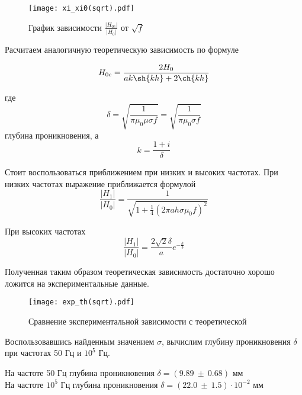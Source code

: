     \begin{figure}
        \centering
        \texttt{[image: xi\_xi0(sqrt).pdf]}
        \caption{График зависимости $\frac{|H_{0c}|}{|H_{0}|}$ от $\sqrt{f}$}
        \label{xi_xi0(sqrt)}
    \end{figure}

    Расчитаем аналогичную теоретическую зависимость по формуле

    \begin{equation}
        H_{0c} = \frac{2 H_0}{a k \sh{k h} + 2 \ch{k h}}
    \end{equation}

    где
    \begin{equation}
        \delta = \sqrt{\frac{1}{\pi \mu_0 \mu \sigma f}} = \sqrt{\frac{1}{\pi \mu_0 \sigma f}}
    \end{equation}
    глубина проникновения, а
    \begin{equation}
       k = \frac{1 + i}{\delta} 
    \end{equation}

    Стоит воспользоваться приближением при низких и высоких частотах. 
    При низких частотах выражение приближается формулой 
    \begin{equation}
        \frac{|H_1|}{|H_0|} = \frac{1}{\sqrt{1 + \frac{1}{4} (2 \pi a h \sigma \mu_0 f)^2}}
    \end{equation}

    При высоких частотах 
    \begin{equation}
        \frac{|H_1|}{|H_0|} = \frac{2 \sqrt{2} \delta}{a} e^{-\frac{h}{\delta}}
    \end{equation}

    Полученная таким образом теоретическая зависимость достаточно хорошо ложится на экспериментальные данные.

    \begin{figure}
        \centering
        \texttt{[image: exp\_th(sqrt).pdf]}
        \caption{Сравнение экспериментальной зависимости с теоретической}
        \label{exp_th(sqrt)}
    \end{figure}

    Воспользовавшись найденным значением $\sigma$, вычислим глубину проникновения $\delta$ при частотах 50 Гц и $10^5$ Гц.

    \begin{center}
        На частоте 50 Гц глубина проникновения $\delta = (9.89 ~ \pm ~ 0.68)$ мм \\
        На частоте $10^5$ Гц глубина проникновения $\delta = (22.0 ~ \pm ~ 1.5) \cdot 10^{-2}$ мм
    \end{center}
    
